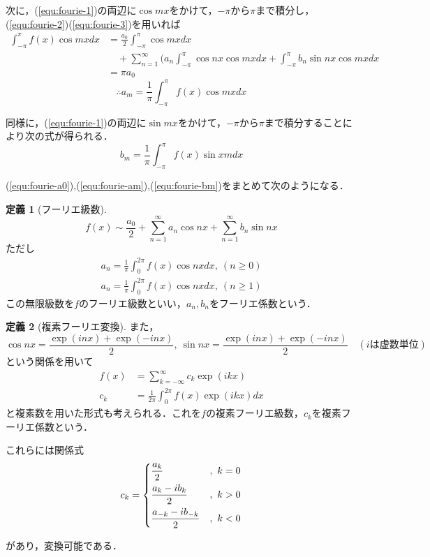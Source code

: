 \documentclass[11pt,a4paper]{jsarticle}
\theoremstyle{definition}
\newtheorem{dfn}{定義}
\begin{document}
次に，(\ref{equ:fourie-1})の両辺に$\cos mx$をかけて，$-\pi$から$\pi$まで積分し，(\ref{equ:fourie-2})(\ref{equ:fourie-3})を用いれば
\begin{align*}
  \int_{-\pi}^{\pi} f(x) \cos mx dx & = \frac{a_0}{2} \int_{-\pi}^{\pi} \cos mx dx                                                                   \\
                                    & \quad + \sum_{n=1}^{\infty} (a_n \int_{-\pi}^{\pi}\cos nx \cos mx dx + \int_{-\pi}^{\pi}b_n \sin nx \cos mx dx \\
                                    & = \pi a_0
\end{align*}
\begin{equation}
  \label{equ:fourie-am}
  \therefore a_m = \frac{1}{\pi}\int_{-\pi}^{\pi} f(x) \cos mx dx
\end{equation}

同様に，(\ref{equ:fourie-1})の両辺に$\sin mx$をかけて，$-\pi$から$\pi$まで積分することにより次の式が得られる．
\begin{equation}
  \label{equ:fourie-bm}
  b_m = \frac{1}{\pi}\int_{-\pi}^{\pi} f(x)\sin xm dx
\end{equation}

(\ref{equ:fourie-a0}),(\ref{equ:fourie-am}),(\ref{equ:fourie-bm})をまとめて次のようになる．

\begin{dfn}[フーリエ級数]
  \begin{equation*}
    f(x) \sim \frac{a_0}{2} + \sum_{n=1}^{\infty} a_n \cos nx + \sum_{n=1}^{\infty} b_n \sin nx
  \end{equation*}
  ただし
  \begin{align*}
    a_n = \frac{1}{\pi} \int_{0}^{2\pi} f(x) \cos nx dx,\ (n\geq 0) \\
    a_n = \frac{1}{\pi} \int_{0}^{2\pi} f(x) \cos nx dx,\ (n\geq 1)
  \end{align*}
  この無限級数を$f$のフーリエ級数といい，$a_n,b_n$をフーリエ係数という．
\end{dfn}

\begin{dfn}[複素フーリエ変換]
  また，$$\cos nx = \frac{\exp (inx) + \exp (-inx)}{2},\ \sin nx = \frac{\exp (inx) + \exp(-inx)}{2}\quad (iは虚数単位)$$という関係を用いて
  \begin{align*}
    f(x) & = \sum_{k=-\infty}^{\infty} c_k \exp(ikx)          \\
    c_k  & = \frac{1}{2\pi} \int_{0}^{2\pi} f(x)\exp (ikx) dx
  \end{align*}
  と複素数を用いた形式も考えられる．これを$f$の複素フーリエ級数，$c_k$を複素フーリエ係数という．

  これらには関係式
  \begin{align*}
    c_k=
    \begin{dcases}
      \frac{a_k}{2}            & ,\ k=0 \\
      \frac{a_k-ib_k}{2}       & ,\ k>0 \\
      \frac{a_{-k}-ib_{-k}}{2} & ,\ k<0
    \end{dcases}
  \end{align*}
\end{dfn}
があり，変換可能である．
\end{document}
